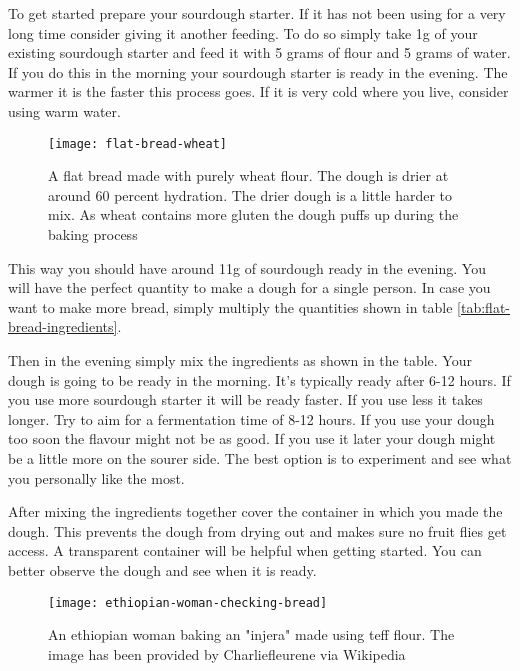 To get started prepare your sourdough starter. If it has not been using for a very
long time consider giving it another feeding. To do so simply take 1g of your
existing sourdough starter and feed it with 5 grams of flour and 5 grams of water.
If you do this in the morning your sourdough starter is ready in the evening. The
warmer it is the faster this process goes. If it is very cold where you live, consider
using warm water.

\begin{figure}[htb!]
  \texttt{[image: flat-bread-wheat]}
  \centering
  \caption{A flat bread made with purely wheat flour. The dough is drier
  at around 60 percent hydration.  The drier dough is a little harder
  to mix. As wheat contains more gluten the dough puffs up during
  the baking process}
\end{figure}

This way you should have around 11g of sourdough ready in the evening. You will have
the perfect quantity to make a dough for a single person. In case you want to make more
bread, simply multiply the quantities shown in table \ref*{tab:flat-bread-ingredients}.

Then in the evening simply mix the ingredients as shown in the table. Your dough
is going to be ready in the morning. It's typically ready after 6-12 hours. If
you use more sourdough starter it will be ready faster. If you use less it takes
longer. Try to aim for a fermentation time of 8-12 hours. If you use
your dough too soon the flavour might not be as good. If you use it later
your dough might be a little more on the sourer side. The best option is to experiment
and see what you personally like the most.

After mixing the ingredients together cover the container in which
you made the dough. This prevents the dough from drying out and makes
sure no fruit flies get access. A transparent container will be helpful
when getting started. You can better observe the dough and see when
it is ready.

\begin{figure}[htb!]
  \texttt{[image: ethiopian-woman-checking-bread]}
  \centering
  \caption{An ethiopian woman baking an "injera" made using teff flour. 
  The image has been provided by Charliefleurene via Wikipedia}
\end{figure}

